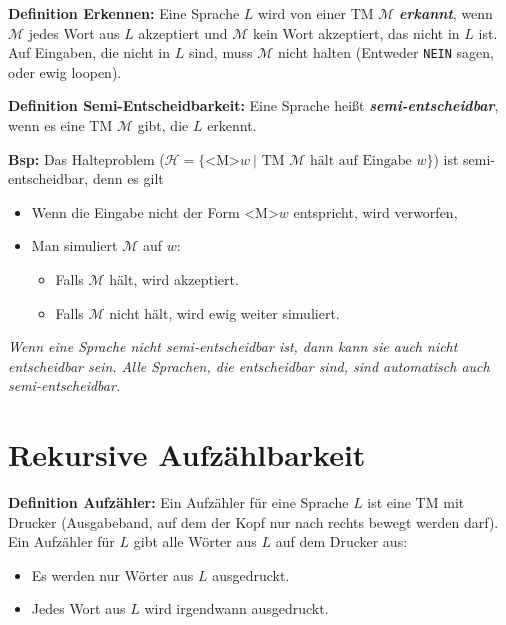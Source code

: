 \documentclass{scrartcl}%
\begin{document}
    \vspace*{0.3cm}
    \textbf{\textsf{Definition Erkennen:}}
    Eine Sprache $L$ wird von einer TM $\mathcal{M}$ \textit{\textbf{\textsf{erkannt}}}, wenn $\mathcal{M}$ jedes Wort aus $L$ akzeptiert und $\mathcal{M}$ kein Wort akzeptiert,
    das nicht in $L$ ist. Auf Eingaben, die nicht in $L$ sind, muss $\mathcal{M}$ nicht halten (Entweder \texttt{NEIN} sagen, oder ewig loopen).

    \vspace*{0.3cm}
    \textbf{\textsf{Definition Semi-Entscheidbarkeit:}}
    Eine Sprache heißt \textit{\textbf{\textsf{semi-entscheidbar}}}, wenn es eine TM $\mathcal{M}$ gibt, die $L$ erkennt.

    \vspace*{0.3cm}
    \textbf{\textsf{Bsp:}} Das Halteproblem ($\mathcal{H} = \{\text{<M>}w\ | \text{ TM }\mathcal{M} \text{ hält auf Eingabe } w\}$) ist semi-entscheidbar, denn es gilt
    \begin{itemize}
        \item Wenn die Eingabe nicht der Form <M>$w$ entspricht, wird verworfen,
        \item Man simuliert $\mathcal{M}$ auf $w$:
        \begin{itemize}
            \item Falls $\mathcal{M}$ hält, wird akzeptiert.
            \item Falls $\mathcal{M}$ nicht hält, wird ewig weiter simuliert.
        \end{itemize}
    \end{itemize}

    \textit{Wenn eine Sprache nicht semi-entscheidbar ist, dann kann sie auch nicht entscheidbar sein. Alle Sprachen, die entscheidbar sind, sind automatisch auch semi-entscheidbar.}

    \section*{Rekursive Aufzählbarkeit}

    \textbf{\textsf{Definition Aufzähler:}}
    Ein Aufzähler für eine Sprache $L$ ist eine TM mit Drucker (Ausgabeband, auf dem der Kopf nur nach rechts bewegt werden darf).
    Ein Aufzähler für $L$ gibt alle Wörter aus $L$ auf dem Drucker aus:
    \begin{itemize}
        \item Es werden nur Wörter aus $L$ ausgedruckt.
        \item Jedes Wort aus $L$ wird irgendwann ausgedruckt.
    \end{itemize}
\end{document}
